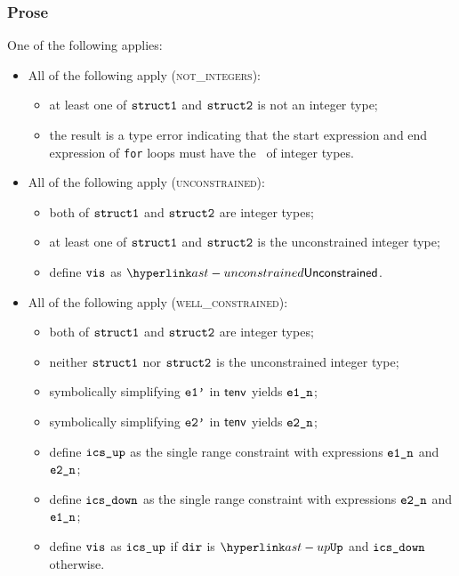 \subsubsection{Prose}
One of the following applies:
\begin{itemize}
  \item All of the following apply (\textsc{not\_integers}):
  \begin{itemize}
    \item at least one of $\texttt{struct1}$ and $\texttt{struct2}$ is not an integer type;
    \item the result is a type error indicating that the start expression and end expression of \texttt{for} loops
          must have the \structure\ of integer types.
  \end{itemize}

  \item All of the following apply (\textsc{unconstrained}):
  \begin{itemize}
    \item both of $\texttt{struct1}$ and $\texttt{struct2}$ are integer types;
    \item at least one of $\texttt{struct1}$ and $\texttt{struct2}$ is the unconstrained integer type;
    \item define $\texttt{vis}$ as $\unconstrained$.
  \end{itemize}

  \item All of the following apply (\textsc{well\_constrained}):
  \begin{itemize}
    \item both of $\texttt{struct1}$ and $\texttt{struct2}$ are integer types;
    \item neither $\texttt{struct1}$ nor $\texttt{struct2}$ is the unconstrained integer type;
    \item symbolically simplifying $\texttt{e1'}$ in $\textsf{tenv}$ yields $\texttt{e1\_n}$\ProseOrTypeError;
    \item symbolically simplifying $\texttt{e2'}$ in $\textsf{tenv}$ yields $\texttt{e2\_n}$\ProseOrTypeError;
    \item define $\texttt{ics\_up}$ as the single range constraint with expressions $\texttt{e1\_n}$ and $\texttt{e2\_n}$;
    \item define $\texttt{ics\_down}$ as the single range constraint with expressions $\texttt{e2\_n}$ and $\texttt{e1\_n}$;
    \item define $\texttt{vis}$ as $\texttt{ics\_up}$ if $\texttt{dir}$ is $\UP$ and $\texttt{ics\_down}$ otherwise.
  \end{itemize}
\end{itemize}

